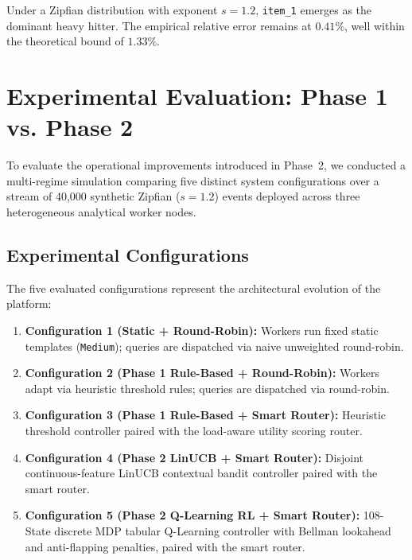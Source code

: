 Under a Zipfian distribution with exponent $s = 1.2$, \texttt{item\_1} emerges as the dominant heavy hitter. The empirical relative error remains at $0.41\%$, well within the theoretical bound of $1.33\%$.

\section{Experimental Evaluation: Phase 1 vs. Phase 2}

To evaluate the operational improvements introduced in Phase~2, we conducted a multi-regime simulation comparing five distinct system configurations over a stream of 40,000 synthetic Zipfian ($s = 1.2$) events deployed across three heterogeneous analytical worker nodes.

\subsection{Experimental Configurations}
The five evaluated configurations represent the architectural evolution of the platform:
\begin{enumerate}
    \item \textbf{Configuration 1 (Static + Round-Robin):} Workers run fixed static templates (\texttt{Medium}); queries are dispatched via naive unweighted round-robin.
    \item \textbf{Configuration 2 (Phase 1 Rule-Based + Round-Robin):} Workers adapt via heuristic threshold rules; queries are dispatched via round-robin.
    \item \textbf{Configuration 3 (Phase 1 Rule-Based + Smart Router):} Heuristic threshold controller paired with the load-aware utility scoring router.
    \item \textbf{Configuration 4 (Phase 2 LinUCB + Smart Router):} Disjoint continuous-feature LinUCB contextual bandit controller paired with the smart router.
    \item \textbf{Configuration 5 (Phase 2 Q-Learning RL + Smart Router):} 108-State discrete MDP tabular Q-Learning controller with Bellman lookahead and anti-flapping penalties, paired with the smart router.
\end{enumerate}

